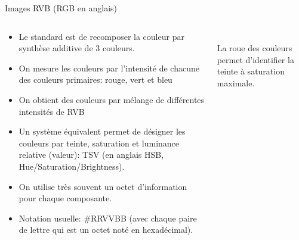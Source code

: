 \begin{frame}[fragile]{Images RVB (RGB en anglais)}
  \begin{columns}
    \begin{column}{.6\linewidth}
      \begin{itemize}
      \item Le standard est de recomposer la couleur par synthèse additive de
        3 couleurs.
      \item On mesure les couleurs par l'intensité de chacune des couleurs
        primaires: rouge, vert et bleu
      \item On obtient des couleurs par mélange de différentes intensités de
        RVB
      \item Un système équivalent permet de désigner les couleurs par teinte,
        saturation et luminance relative (valeur): TSV (en anglais HSB,
        Hue/Saturation/Brightness).
      \item On utilise très souvent un octet d'information pour chaque
        composante.
      \item Notation usuelle: \#RRVVBB (avec chaque paire de lettre qui est un
        octet noté en hexadécimal).
      \end{itemize}
    \end{column}%
    \begin{column}{.4\linewidth}\centering
      \\
      La roue des couleurs permet d'identifier la teinte à saturation
      maximale.
    \end{column}
  \end{columns}
\end{frame}
